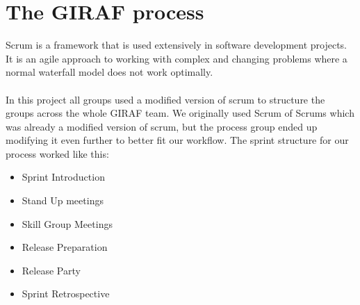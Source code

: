 \section{The GIRAF process}\label{the-giraf-process}
Scrum is a framework that is used extensively in software development projects.
It is an agile approach to working with complex and changing problems where a normal waterfall model does not work optimally.
\\\\
In this project all groups used a modified version of scrum to structure the groups across the whole GIRAF team.
We originally used Scrum of Scrums which was already a modified version of scrum, but the process group ended up modifying it even further to better fit our workflow.
The sprint structure for our process worked like this:

\begin{itemize}
    \item Sprint Introduction
    \item Stand Up meetings
    \item Skill Group Meetings
    \item Release Preparation
    \item Release Party
    \item Sprint Retrospective
\end{itemize}

